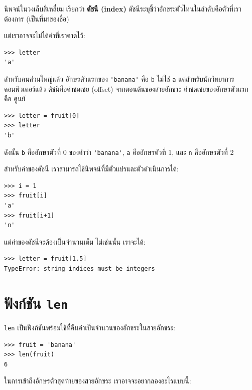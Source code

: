 นิพจน์ในวงเล็บสี่เหลี่ยม เรียกว่า {\bf ดัชนี (index)}
ดัชนีระบุชี้ว่าอักขระตัวไหนในลำดับคือตัวที่เราต้องการ (เป็นที่มาของชื่อ)

แต่เราอาจจะไม่ได้ค่าที่เราคาดไว้:

\begin{verbatim}
>>> letter
'a'
\end{verbatim}
%
สำหรับคนส่วนใหญ่แล้ว อักษรตัวแรกของ \verb"'banana'" คือ {\tt b} ไม่ใช่ {\tt a}
แต่สำหรับนักวิทยาการคอมพิวเตอร์แล้ว ดัชนีคือค่าชดเชย (offset) จากตอนต้นของสายอักขระ
ค่าชดเชยของอักษรตัวแรก คือ ศูนย์

\begin{verbatim}
>>> letter = fruit[0]
>>> letter
'b'
\end{verbatim}
%
ดังนั้น {\tt b} คืออักษรตัวที่ 0 ของคำว่า \verb"'banana'", {\tt a} คืออักษรตัวที่ 1, และ {\tt n} คืออักษรตัวที่ 2

สำหรับค่าของดัชนี เราสามารถใช้นิพจน์ที่มีตัวแปรและตัวดำเนินการได้:

\begin{verbatim}
>>> i = 1
>>> fruit[i]
'a'
>>> fruit[i+1]
'n'
\end{verbatim}
%

แต่ค่าของดัชนีจะต้องเป็นจำนวนเต็ม ไม่เช่นนั้น เราจะได้:

\begin{verbatim}
>>> letter = fruit[1.5]
TypeError: string indices must be integers
\end{verbatim}
%

\section{ฟังก์ชัน {\tt len}}

{\tt len} เป็นฟังก์ชันพร้อมใช้ที่คืนค่าเป็นจำนวนของอักขระในสายอักขระ:

\begin{verbatim}
>>> fruit = 'banana'
>>> len(fruit)
6
\end{verbatim}
%
ในการเข้าถึงอักษรตัวสุดท้ายของสายอักขระ เราอาจจะอยากลองอะไรแบบนี้:

